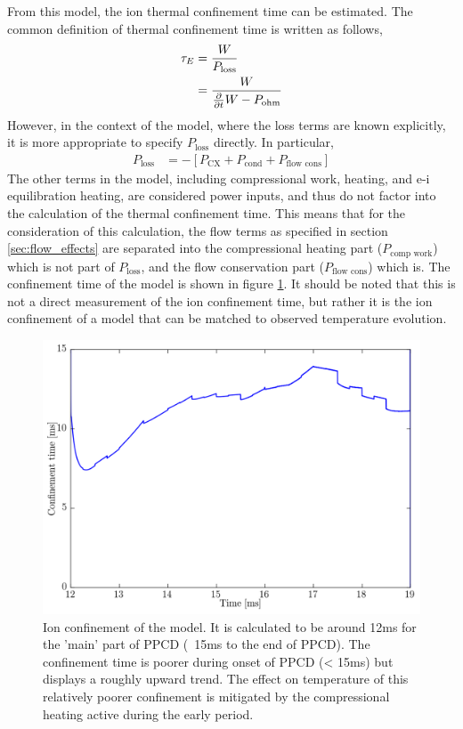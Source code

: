 From this model, the ion thermal confinement time can be estimated. The common definition of thermal confinement time is written as follows,
\begin{align}
    \tau_E &= \frac{W}{P_{\text{loss}}}\\
    &= \frac{W}{\frac{\partial}{\partial t} W - P_{\text{ohm}}}
\end{align}
However, in the context of the model, where the loss terms are known explicitly, it is more appropriate to specify $P_{\text{loss}}$ directly. In particular, 
\begin{align}
    P_{\text{loss}} &= - [P_{\text{CX}} + P_{\text{cond}} + P_{\text{flow cons}}]
\end{align}
The other terms in the model, including compressional work, \adhoc heating, and e-i equilibration heating, are considered power inputs, and thus do not factor into the calculation of the thermal confinement time. 
This means that for the consideration of this calculation, the flow terms as specified in section \ref{sec:flow_effects} are separated into the compressional heating part ($P_{\text{comp work}}$) which is not part of $P_{\text{loss}}$, and the flow conservation part ($P_{\text{flow cons}}$) which is. The confinement time of the model is shown in figure \ref{fig:conf_time}. It should be noted that this is not a direct measurement of the ion confinement time, but rather it is the ion confinement of a model that can be matched to observed temperature evolution.
\begin{figure}
    \centering
    \includegraphics[width = \linewidth]{ion_transport_results/conf_time.png}
    \caption[Model ion confinement time]{Ion confinement of the model. It is calculated to be around 12ms for the 'main' part of PPCD (~15ms to the end of PPCD). The confinement time is poorer during onset of PPCD (< 15ms) but displays a roughly upward trend. The effect on temperature of this relatively poorer confinement is mitigated by the compressional heating active during the early period. }
    \label{fig:conf_time}
\end{figure}
